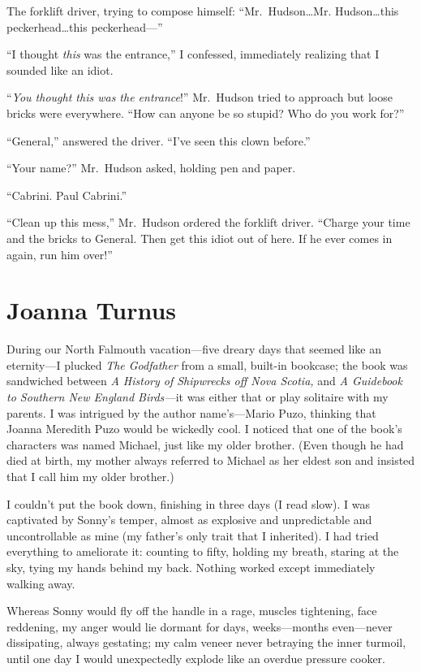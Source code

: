 The forklift driver, trying to compose himself: ``Mr.~Hudson\ldots Mr.
Hudson\ldots this peckerhead\ldots this peckerhead---''

``I thought \emph{this} was the entrance,'' I confessed, immediately
realizing that I sounded like an idiot.

``\emph{You thought this was the entrance}!'' Mr.~Hudson tried to
approach but loose bricks were everywhere. ``How can anyone be so
stupid? Who do you work for?''

``General,'' answered the driver. ``I've seen this clown before.''

``Your name?'' Mr.~Hudson asked, holding pen and paper.

``Cabrini. Paul Cabrini.''

``Clean up this mess,'' Mr.~Hudson ordered the forklift driver. \linebreak ``Charge
your time and the bricks to General. Then get this idiot out of here. If
he ever comes in again, run him over!''

\chapter{Joanna Turnus}

\titlemark

During our North Falmouth vacation---five dreary days that seemed like
an eternity---I plucked \emph{The Godfather} from a small, built-in
bookcase; the book was sandwiched between \emph{A History of Shipwrecks
off Nova Scotia,} and \emph{A Guidebook to Southern New England
Birds---}it was either that or play solitaire with my parents. I was
intrigued by the author name's---Mario Puzo, thinking that Joanna
Meredith Puzo would be wickedly cool. I noticed that one of the book's
characters was named Michael, just like my older brother. (Even though
he had died at birth, my mother always referred to Michael as her eldest
son and insisted that I call him my older brother.)

I couldn't put the book down, finishing in three days (I read slow). I
was captivated by Sonny's temper, almost as explosive and unpredictable
and uncontrollable as mine (my father's only trait that I inherited). I
had tried everything to ameliorate it: counting to fifty, holding my
breath, staring at the sky, tying my hands behind my back. Nothing
worked except immediately walking away.

Whereas Sonny would fly off the handle in a rage, muscles tightening,
face reddening, my anger would lie dormant for days, weeks---months
even---never dissipating, always gestating; my calm veneer never
betraying the inner turmoil, until one day I would unexpectedly explode
like an overdue pressure cooker.


